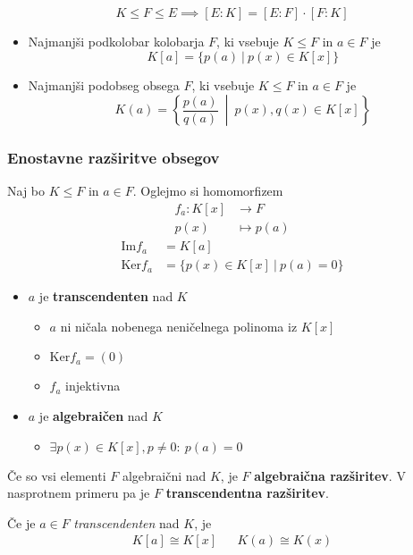 \[ K \leq F \leq E \implies [E:K] = [E:F] \cdot [F:K] \]

\begin{itemize}
	\item Najmanjši podkolobar kolobarja $F$, ki vsebuje $K \leq F$ in $a \in F$ je
	\[K[a] = \{p(a)\ |\ p(x) \in K[x]\}\]
	\item Najmanjši podobseg obsega $F$, ki vsebuje $K \leq F$ in $a \in F$ je
	\[K(a) = \left\{ \frac{ p(a) }{ q(a) }\ \middle|\ p(x), q(x) \in K[x] \right\} \]
\end{itemize}

\subsubsection*{Enostavne razširitve obsegov}
Naj bo $K \leq F$ in $a \in F$. Oglejmo si homomorfizem
\begin{align*}
	f_a: K[x] &\to F \\
		p(x) & \mapsto p(a)
\end{align*}
\begin{align*}
	\text{Im}f_a &= K[a] \\
	\text{Ker}f_a &= \{ p(x) \in K[x]\ |\ p(a) = 0\}
\end{align*}

\renewcommand{\labelitemii}{$\iff$}
\begin{itemize}
	\item $a$ je \textbf{transcendenten} nad $K$
	\begin{itemize}
		\item $a$ ni ničala nobenega neničelnega polinoma iz $K[x]$
		\item $\text{Ker} f_a = (0)$
		\item $f_a$ injektivna
	\end{itemize}
	\item $a$ je \textbf{algebraičen} nad $K$
	\begin{itemize}
		\item $\exists p(x) \in K[x], p \neq 0:\ p(a) = 0$
	\end{itemize}
\end{itemize}

Če so vsi elementi $F$ algebraični nad $K$, je $F$ \textbf{algebraična razširitev}. V nasprotnem primeru pa je $F$ \textbf{transcendentna razširitev}.

Če je $a \in F$ \emph{transcendenten} nad $K$, je
\begin{align*}
	K[a] \cong  K[x] && K(a) \cong K(x)
\end{align*}

